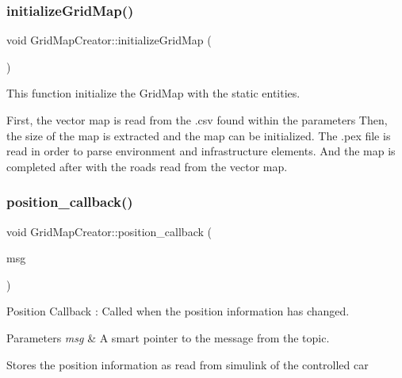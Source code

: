 \subsubsection{\texorpdfstring{initialize\+Grid\+Map()}{initializeGridMap()}}
{\footnotesize\ttfamily void Grid\+Map\+Creator\+::initialize\+Grid\+Map (\begin{DoxyParamCaption}{ }\end{DoxyParamCaption})\hspace{0.3cm}{\ttfamily [inline]}}



This function initialize the Grid\+Map with the static entities. 

First, the vector map is read from the .csv found within the parameters Then, the size of the map is extracted and the map can be initialized. The .pex file is read in order to parse environment and infrastructure elements. And the map is completed after with the roads read from the vector map. \mbox{\label{classGridMapCreator_a5b4b8966d53d30fad9ceca477690f452}} 
\subsubsection{\texorpdfstring{position\+\_\+callback()}{position\_callback()}}
{\footnotesize\ttfamily void Grid\+Map\+Creator\+::position\+\_\+callback (\begin{DoxyParamCaption}\item[{const nav\+\_\+msgs\+::\+Odometry\+::\+Const\+Ptr \&}]{msg }\end{DoxyParamCaption})\hspace{0.3cm}{\ttfamily [inline]}}



Position Callback \+: Called when the position information has changed. 


\begin{DoxyParams}{Parameters}
{\em msg} & A smart pointer to the message from the topic.\\
\hline
\end{DoxyParams}
Stores the position information as read from simulink of the controlled car \mbox{\label{classGridMapCreator_a9548502241b075beaa07b23c95428711}} 
